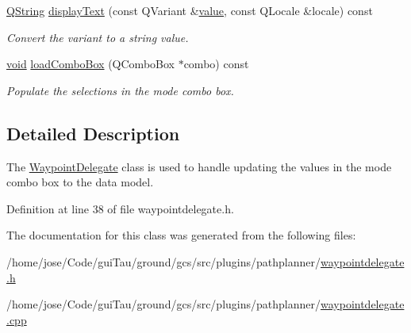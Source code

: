 \begin{DoxyCompactItemize}
\hyperlink{group___u_a_v_objects_plugin_gab9d252f49c333c94a72f97ce3105a32d}{Q\-String} \hyperlink{group___path_planner_ga14243b35579b422c1343085132072746}{display\-Text} (const Q\-Variant \&\hyperlink{glext_8h_aa0e2e9cea7f208d28acda0480144beb0}{value}, const Q\-Locale \&locale) const 
\begin{DoxyCompactList}\small\item\em Convert the variant to a string value. \end{DoxyCompactList}\item 
\hyperlink{group___u_a_v_objects_plugin_ga444cf2ff3f0ecbe028adce838d373f5c}{void} \hyperlink{group___path_planner_ga2ea240fcdff4626ac277f5160f67f2e6}{load\-Combo\-Box} (Q\-Combo\-Box $\ast$combo) const 
\begin{DoxyCompactList}\small\item\em Populate the selections in the mode combo box. \end{DoxyCompactList}\end{DoxyCompactItemize}


\subsection{Detailed Description}
The \hyperlink{class_waypoint_delegate}{Waypoint\-Delegate} class is used to handle updating the values in the mode combo box to the data model. 

Definition at line 38 of file waypointdelegate.\-h.



The documentation for this class was generated from the following files\-:\begin{DoxyCompactItemize}
\item 
/home/jose/\-Code/gui\-Tau/ground/gcs/src/plugins/pathplanner/\hyperlink{waypointdelegate_8h}{waypointdelegate.\-h}\item 
/home/jose/\-Code/gui\-Tau/ground/gcs/src/plugins/pathplanner/\hyperlink{waypointdelegate_8cpp}{waypointdelegate.\-cpp}\end{DoxyCompactItemize}
